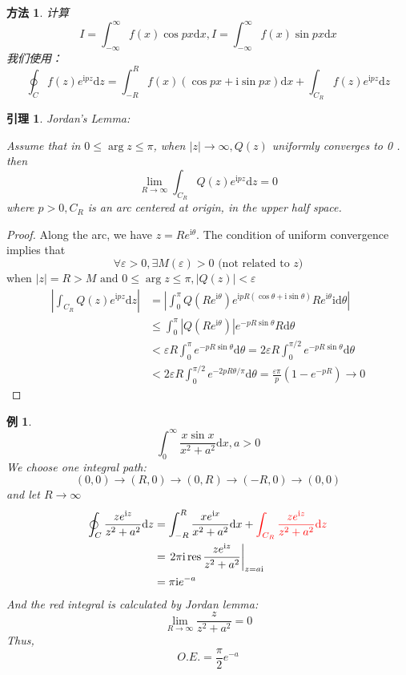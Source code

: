 \documentclass[10pt, a4paper, oneside]{ctexbook}
\newtheorem{lemma}[theorem]{引理}
\newtheorem{example}[theorem]{例}
\newtheorem{method}[theorem]{方法}
\def\D{\mathrm{d}}
\begin{document}
\begin{method}
    计算
    $$
    I=\int_{-\infty}^{\infty} f(x) \cos p x \D x, I=\int_{-\infty}^{\infty} f(x) \sin p x \D x
    $$\rm
    我们使用：
    $$
    \oint_{C} f(z) e^{\mathrm{i} p z} \D z=\int_{-R}^{R} f(x)(\cos p x+\mathrm{i} \sin p x) \D x+\int_{C_{R}} f(z) e^{\mathrm{i} p z} \D z
    $$
\end{method}
\begin{lemma}
    Jordan's Lemma:\rm

    Assume that in $0 \leq \arg z \leq \pi$, when $|z| \rightarrow \infty, Q(z)$ uniformly converges to 0 . then
    $$
    \lim _{R \rightarrow \infty} \int_{C_{R}} Q(z) e^{\mathrm{i} p z} \D z=0
    $$
    where $p>0, C_{R}$ is an arc centered at origin, in the upper half space.
\end{lemma}
\begin{proof} Along the arc, we have $z=R e^{\mathrm{i} \theta}$.
The condition of uniform convergence implies that $$\forall \varepsilon>0, \exists M(\varepsilon)>0 \text { (not related to } z)$$ when $|z|=R>M
\text { and } 0 \leq \arg z \leq \pi,|Q(z)|<\varepsilon $
$$
\begin{aligned}
\left|\int_{C_{R}} Q(z) e^{\mathrm{i} p z} \D z\right|&=\left|\int_{0}^{\pi} Q\left(R e^{\mathrm{i} \theta}\right) e^{\mathrm{i} p R(\cos \theta+\mathrm{i} \sin \theta)} R e^{\mathrm{i} \theta} \mathrm{i} \D \theta\right| \\
&\leq \int_{0}^{\pi}\left|Q\left(R e^{\mathrm{i} \theta}\right)\right| e^{-p R \sin \theta} R \D \theta\\
&<\varepsilon R \int_{0}^{\pi} e^{-p R \sin \theta} \D \theta=2 \varepsilon R \int_{0}^{\pi / 2} e^{-p R \sin \theta} \D \theta\\
&<2 \varepsilon R \int_{0}^{\pi / 2} e^{-2 p R \theta / \pi} \D \theta=\frac{\varepsilon \pi}{p}\left(1-e^{-p R}\right) \to 0
\end{aligned}
$$
\end{proof}
\begin{example}
     $$\int_{0}^{\infty} \frac{x \sin x}{x^{2}+a^{2}} \D x, a>0 $$
    \rm We choose one integral path:
    $$(0,0)\to(R,0)\to(0,R)\to(-R,0)\to(0,0)$$ and let $R\to \infty$
    \begin{align*}
        \begin{aligned}
        \oint_{C} \frac{z e^{\mathrm{i} z}}{z^{2}+a^{2}} \D z&=\int_{-R}^{R} \frac{x e^{\mathrm{i} x}}{x^{2}+a^{2}} \D x+{\color{red} \int_{C_{R}} \frac{z e^{\mathrm{i} z}}{z^{2}+a^{2}} \D z }\\
        &=\left.2 \pi \mathrm{i} \operatorname{res} \frac{z e^{\mathrm{i} z}}{z^{2}+a^{2}}\right|_{z=a \mathrm{i}}\\
        &=\pi \mathrm{i} e^{-a}
        \end{aligned}
    \end{align*}
    And the {\color{red}red integral} is calculated by Jordan lemma:
    $$\lim_{R\to \infty} \frac{z}{z^2+a^2} = 0$$
    Thus, $$O.E.=\frac{\pi}{2}e^{-a}$$
\end{example}
\end{document}
